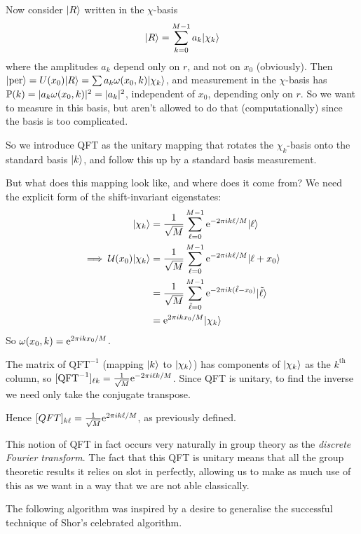 \documentclass[]{article}
\renewcommand{\it}[1]{\textit{#1}}
\newcommand{\U}{\mathcal{U}}
\newcommand{\QFT}{\textrm{QFT}}
\newcommand{\per}{\ket{\textrm{per}}}
\begin{document}
Now consider $\ket{R}$ written in the $\chi$-basis
\begin{align*}
\ket{R} = \sum_{k=0}^{M-1}a_k\ket{\chi_k}
\end{align*}
where the amplitudes $a_k$ depend only on $r$, and not on $x_0$ (obviously). Then $\per = U(x_0)\ket{R} = \sum a_k\omega(x_0,k)\ket{\chi_k}$, and measurement in the $\chi$-basis has $\P(k) = |a_k\omega(x_0,k)|^2 = |a_k|^2$, independent of $x_0$, depending only on $r$. So we want to measure in this basis, but aren't allowed to do that (computationally) since the basis is too complicated.

So we introduce QFT as the unitary mapping that rotates the $\chi_k$-basis onto the standard basis $\ket{k}$, and follow this up by a standard basis measurement.

But what does this mapping look like, and where does it come from? We need the explicit form of the shift-invariant eigenstates:
\begin{align*}
	\ket{\chi_k} &= \frac{1}{\sqrt{M}}\sum_{\ell = 0}^{M-1}\e^{-2\pi ik\ell/M}\ket{\ell}\\
	\implies \U(x_0)\ket{\chi_k} &= \frac{1}{\sqrt{M}}\sum_{\ell = 0}^{M-1}\e^{-2\pi ik\ell/M}\ket{\ell + x_0}\\
	&= \frac{1}{\sqrt{M}}\sum_{\tilde{\ell} = 0}^{M-1}\e^{-2\pi i k(\tilde{\ell} - x_0)}\ket{\tilde{\ell}}\\
	&= \e^{2\pi i kx_0/M}\ket{\chi_k}
\end{align*}
So $\omega(x_0,k) = \e^{2\pi i k x_0/M}$.

The matrix of $\QFT^{-1}$ (mapping $\ket{k}$ to $\ket{\chi_k}$) has components of $\ket{\chi_k}$ as the $k^{\textrm{th}}$ column, so $[\QFT^{-1}]_{\ell k} = \frac{1}{\sqrt{M}}\e^{-2\pi i\ell k/M}$. Since QFT is unitary, to find the inverse we need only take the conjugate transpose.

Hence $[QFT]_{k\ell} = \frac{1}{\sqrt{M}}\e^{2\pi ik\ell/M}$, as previously defined.

This notion of QFT in fact occurs very naturally in group theory as the \it{discrete Fourier transform}. The fact that this QFT is unitary means that all the group theoretic results it relies on slot in perfectly, allowing us to make as much use of this as we want in a way that we are not able classically.


The following algorithm was inspired by a desire to generalise the successful technique of Shor's celebrated algorithm.
\end{document}
